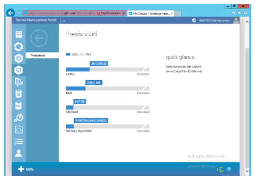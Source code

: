\documentclass[11pt, a4paper]{article}
\begin{document}
$\;$ \\ \\
\noindent\begin{minipage}{\textwidth}
    \centering
    \includegraphics[width=\textwidth]{Azure_5.png}
\end{minipage}
\end{document}
